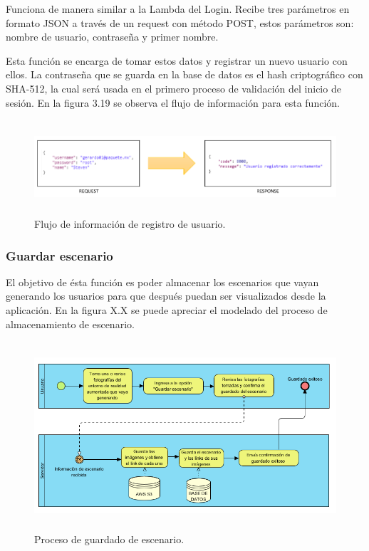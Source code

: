 Funciona de manera similar a la Lambda del Login. Recibe tres parámetros en formato JSON a través de un request con método POST, estos parámetros son: nombre de usuario, contraseña y primer nombre. \par
Esta función se encarga de tomar estos datos y registrar un nuevo usuario con ellos. La contraseña que se guarda en la base de datos es el hash criptográfico con SHA-512, la cual será usada en el primero proceso de validación del inicio de sesión. En la figura 3.19 se observa el flujo de información para esta función.
\begin{figure}[h!]
	\centering
	\includegraphics[width=15cm,height=3.5cm]{imagenes/desarrollo/arquitectura/REGISTER_SUCCESS.png}
	\caption{Flujo de información de registro de usuario.}
	\label{fig:regsuccess}
\end{figure}
\par

\subsubsection{Guardar escenario}
El objetivo de ésta función es poder almacenar los escenarios que vayan generando los usuarios para que después puedan ser visualizados desde la aplicación. En la figura X.X se puede apreciar el modelado del proceso de almacenamiento de escenario. \par
\begin{figure}[h!]
	\centering
	\includegraphics[width=13cm,height=7cm]{imagenes/desarrollo/diagramas/BPMN_STORESC.png}
	\caption{Proceso de guardado de escenario.}
	\label{fig:regsuccess}
\end{figure}

